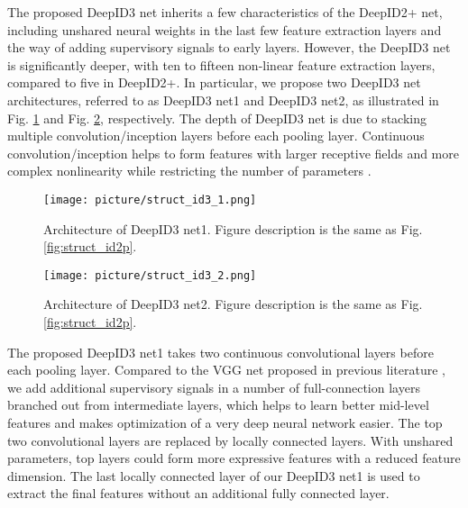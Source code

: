 \documentclass[10pt,twocolumn,letterpaper]{article}
\begin{document}
The proposed DeepID3 net inherits a few characteristics of the DeepID2+ net, including unshared neural weights in the last few feature extraction layers and the way of adding supervisory signals to early layers. However, the DeepID3 net is significantly deeper, with ten to fifteen non-linear feature extraction layers, compared to five in DeepID2+. In particular, we propose two DeepID3 net architectures, referred to as DeepID3 net1 and DeepID3 net2, as illustrated in Fig. \ref{fig:struct_id3_1} and Fig. \ref{fig:struct_id3_2}, respectively. The depth of DeepID3 net is due to stacking multiple convolution/inception layers before each pooling layer. Continuous convolution/inception helps to form features with larger receptive fields and more complex nonlinearity while restricting the number of parameters \cite{simonyan2014}.

\begin{figure}[t]
\begin{center}
\texttt{[image: picture/struct\_id3\_1.png]}
\end{center}
\vspace{-0.15in}
\caption{Architecture of DeepID3 net1. Figure description is the same as Fig. \ref{fig:struct_id2p}.}
\label{fig:struct_id3_1}
\end{figure}

\begin{figure}[t]
\begin{center}
\texttt{[image: picture/struct\_id3\_2.png]}
\end{center}
\vspace{-0.15in}
\caption{Architecture of DeepID3 net2. Figure description is the same as Fig. \ref{fig:struct_id2p}.}
\label{fig:struct_id3_2}
\end{figure}


The proposed DeepID3 net1 takes two continuous convolutional layers before each pooling layer. Compared to the VGG net proposed in previous literature \cite{simonyan2014,yi2014}, we add additional supervisory signals in a number of full-connection layers branched out from intermediate layers, which helps to learn better mid-level features and makes optimization of a very deep neural network easier. The top two convolutional layers are replaced by locally connected layers. With unshared parameters, top layers could form more expressive features with a reduced feature dimension. The last locally connected layer of our DeepID3 net1 is used to extract the final features without an additional fully connected layer.
\end{document}
